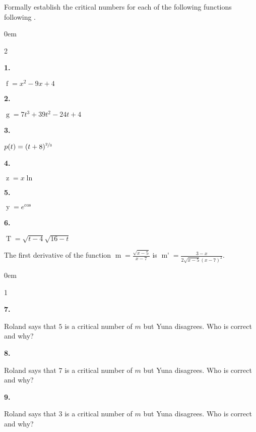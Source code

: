 \documentclass[12pt,]{book}
\theoremstyle{plain}
\theoremstyle{definition}
\numberwithin{equation}{section}
\newenvironment{exercisegroup}%
{\medskip\noindent}%
{\par\bigskip}%
\newlength{\exercisegroupindent}%
\newlength{\exercisegroupitemwidth}%
\newenvironment{exercisegrouplist}%
{\vspace{-\partopsep}%
\begin{adjustwidth}{\exercisegroupindent}{0em}}%
{\end{adjustwidth}%
\vspace{-\partopsep}%
\vspace{\baselineskip}}%
\newenvironment{exercisegroupbycol}[1]%
{\begin{exercisegrouplist}%
\vspace{-\multicolsep}%
\begin{multicols}{#1}%
\setlength{\parindent}{0em}%
\setlength{\exercisegroupitemwidth}{\linewidth}}%
{\end{multicols}%
\vspace{-\multicolsep}%
\end{exercisegrouplist}}%
\newenvironment{exercisegroupitem}[1]%
{\begin{minipage}[t]{\exercisegroupitemwidth}
\vspace{0pt}%
{\bfseries#1}%
\rule{0pt}{\baselineskip}}{\strut%
\end{minipage}%
\hspace{\columnsep}}%
\providecommand\phantomsection{}
\newcommand{\fe}[2]{\mathop{{#1}{\left(#2\right)}}}
\newcommand{\fd}[1]{#1'}
\begin{document}
\begin{exercisegroup}%
Formally establish the critical numbers for each of the following functions following .%
\par
\begin{exercisegroupbycol}{2}%
\begin{exercisegroupitem}{1. }\phantomsection\hypertarget{exercise-403}{\null}
\(\fe{f}{x}=x^2-9x+4\)%
\end{exercisegroupitem}%
\par%
\begin{exercisegroupitem}{2. }\phantomsection\hypertarget{exercise-404}{\null}
\(\fe{g}{t}=7t^3+39t^2-24t+4\)%
\end{exercisegroupitem}%
\par%
\begin{exercisegroupitem}{3. }\phantomsection\hypertarget{exercise-405}{\null}
\(\fe{p}{t}=(t+8)^{\sfrac{2}{3}}\)%
\end{exercisegroupitem}%
\par%
\begin{exercisegroupitem}{4. }\phantomsection\hypertarget{exercise-406}{\null}
\(\fe{z}{x}=x\fe{\ln}{x}\)%
\end{exercisegroupitem}%
\par%
\begin{exercisegroupitem}{5. }\phantomsection\hypertarget{exercise-407}{\null}
\(\fe{y}{\theta}=e^{\fe{\cos}{\theta}}\)%
\end{exercisegroupitem}%
\par%
\begin{exercisegroupitem}{6. }\phantomsection\hypertarget{exercise-408}{\null}
\(\fe{T}{t}=\sqrt{t-4}\sqrt{16-t}\)%
\end{exercisegroupitem}%
\par%
\end{exercisegroupbycol}%
\end{exercisegroup}%
\begin{exercisegroup}%
The first derivative of the function \(\fe{m}{x}=\frac{\sqrt{x-5}}{x-7}\) is \(\fe{\fd{m}}{x}=\frac{3-x}{2\sqrt{x-5}(x-7)^2}\).%
\par
\begin{exercisegroupbycol}{1}%
\begin{exercisegroupitem}{7. }\phantomsection\hypertarget{exercise-409}{\null}
Roland says that \(5\) is a critical number of \(m\) but Yuna disagrees.  Who is correct and why?%
\end{exercisegroupitem}%
\par%
\begin{exercisegroupitem}{8. }\phantomsection\hypertarget{exercise-410}{\null}
Roland says that \(7\) is a critical number of \(m\) but Yuna disagrees.  Who is correct and why?%
\end{exercisegroupitem}%
\par%
\begin{exercisegroupitem}{9. }\phantomsection\hypertarget{exercise-411}{\null}
Roland says that \(3\) is a critical number of \(m\) but Yuna disagrees.  Who is correct and why?%
\end{exercisegroupitem}%
\par%
\end{exercisegroupbycol}%
\end{exercisegroup}%
\end{document}
